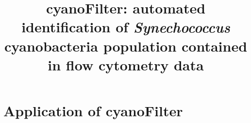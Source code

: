 \documentclass[9pt]{extarticle}
\begin{document}

\title{\textbf{cyanoFilter: automated identification of \emph{Synechococcus} cyanobacteria population contained in flow cytometry data}}
\date{}

		
		
		
		

\maketitle



\section*{Application of cyanoFilter}
\end{document}
